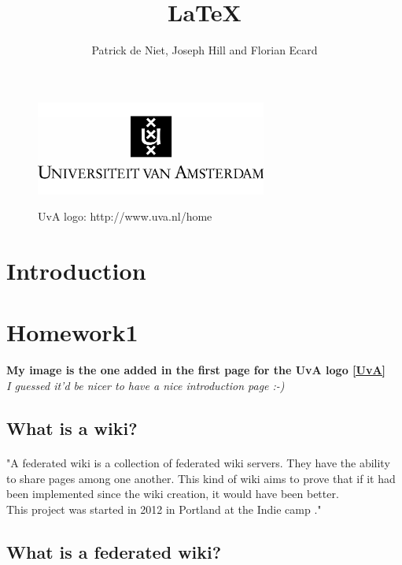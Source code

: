 \documentclass[10pt,a4paper]{article}
\author{Patrick de Niet, Joseph Hill and Florian Ecard}
\title{\LaTeX}
\begin{document}
    
\begin{figure}[t]
\centering
\includegraphics[width=7.6cm]{uva.jpg}\\
\caption{UvA logo: http://www.uva.nl/home}
\end{figure}
\maketitle


\newpage
\section{Introduction}
\paragraph{}


\newpage
\tableofcontents


\newpage
\section{Homework1}
\textbf{My image is the one added in the first page for the UvA logo \ref{UvA}}\\
\textit{I guessed it'd be nicer to have a nice introduction page :-)}

\subsection{What is a wiki?}

\paragraph{}"A federated wiki is a collection of federated wiki servers. They have the ability to share pages among one another. This kind of wiki aims to prove that if it had been implemented since the wiki creation, it would have been better.\\
This project was started in 2012 in Portland at the Indie camp \cite{floref2}."\cite{floref1}

\subsection{What is a federated wiki?}
\end{document}
